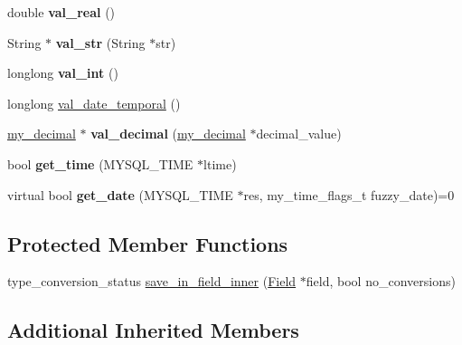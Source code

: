 \begin{DoxyCompactItemize}
\item 
\mbox{\label{classItem__datetime__func_ae1365c175761dce1f4f2f1d07a3d8751}} 
double {\bfseries val\+\_\+real} ()
\item 
\mbox{\label{classItem__datetime__func_a89a941cd2dfe34a8aeb68a48cc2243dc}} 
String $\ast$ {\bfseries val\+\_\+str} (String $\ast$str)
\item 
\mbox{\label{classItem__datetime__func_a9ea1e0731bffd66450e6a81c5b860658}} 
longlong {\bfseries val\+\_\+int} ()
\item 
longlong \mbox{\hyperlink{classItem__datetime__func_a10b03b1938f6aa1c40e1191fe304f943}{val\+\_\+date\+\_\+temporal}} ()
\item 
\mbox{\label{classItem__datetime__func_a0e19e2dc91b4dce698adb966c143ce3b}} 
\mbox{\hyperlink{classmy__decimal}{my\+\_\+decimal}} $\ast$ {\bfseries val\+\_\+decimal} (\mbox{\hyperlink{classmy__decimal}{my\+\_\+decimal}} $\ast$decimal\+\_\+value)
\item 
\mbox{\label{classItem__datetime__func_a018351e77b45bd1464072e08d381b471}} 
bool {\bfseries get\+\_\+time} (M\+Y\+S\+Q\+L\+\_\+\+T\+I\+ME $\ast$ltime)
\item 
\mbox{\label{classItem__datetime__func_a2b483855ec861bd7b277442891cbdddc}} 
virtual bool {\bfseries get\+\_\+date} (M\+Y\+S\+Q\+L\+\_\+\+T\+I\+ME $\ast$res, my\+\_\+time\+\_\+flags\+\_\+t fuzzy\+\_\+date)=0
\end{DoxyCompactItemize}
\subsection*{Protected Member Functions}
\begin{DoxyCompactItemize}
\item 
type\+\_\+conversion\+\_\+status \mbox{\hyperlink{classItem__datetime__func_a81b32a747901bce656f4a1616650621d}{save\+\_\+in\+\_\+field\+\_\+inner}} (\mbox{\hyperlink{classField}{Field}} $\ast$field, bool no\+\_\+conversions)
\end{DoxyCompactItemize}
\subsection*{Additional Inherited Members}


